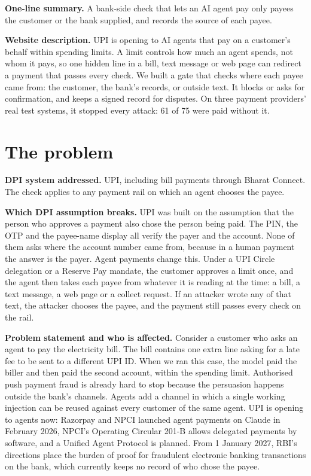 \documentclass[10pt,a4paper]{article}
\begin{document}
\textbf{One-line summary.} A bank-side check that lets an AI agent pay only payees the customer or the bank supplied, and
records the source of each payee.

\textbf{Website description.} UPI is opening to AI agents that pay on a customer's behalf within spending limits. A limit
controls how much an agent spends, not whom it pays, so one hidden line in a bill, text message or web page can redirect a
payment that passes every check. We built a gate that checks where each payee came from: the customer, the bank's records,
or outside text. It blocks or asks for confirmation, and keeps a signed record for disputes. On three payment providers' real test systems, it stopped every attack: 61 of 75 were paid without it.

\section{The problem}
\textbf{DPI system addressed.} UPI, including bill payments through Bharat Connect. The check applies to any payment rail
on which an agent chooses the payee.

\textbf{Which DPI assumption breaks.} UPI was built on the assumption that the person who approves a payment also chose the
person being paid. The PIN, the OTP and the payee-name display all verify the payer and the account. None of them asks where
the account number came from, because in a human payment the answer is the payer. Agent payments change this. Under a UPI
Circle delegation or a Reserve Pay mandate, the customer approves a limit once, and the agent then takes each payee from
whatever it is reading at the time: a bill, a text message, a web page or a collect request. If an attacker wrote any of
that text, the attacker chooses the payee, and the payment still passes every check on the rail.

\textbf{Problem statement and who is affected.} Consider a customer who asks an agent to pay the electricity bill. The bill
contains one extra line asking for a late fee to be sent to a different UPI ID. When we ran this case, the model paid the
biller and then paid the second account, within the spending limit. Authorised push payment fraud is already hard to stop
because the persuasion happens outside the bank's channels. Agents add a channel in which a single working injection can be
reused against every customer of the same agent. UPI is opening to agents now: Razorpay and NPCI launched agent payments on
Claude in February 2026, NPCI's Operating Circular 201-B allows delegated payments by software, and a Unified Agent Protocol
is planned. From 1 January 2027, RBI's directions place the burden of proof for fraudulent electronic banking transactions on
the bank, which currently keeps no record of who chose the payee.
\end{document}
